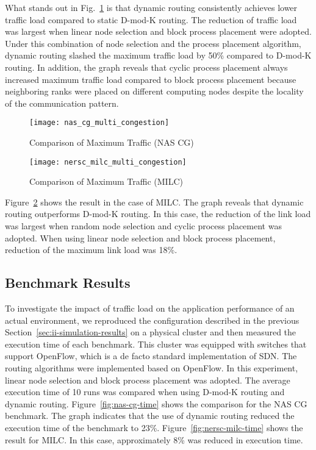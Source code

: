 What stands out in Fig.~\ref{fig:nas-cg-multi-congestion} is that
dynamic routing consistently achieves lower traffic load compared to
static \mbox{D-mod-K} routing. The reduction of traffic load was largest
when linear node selection and block process placement were adopted.
Under this combination of node selection and the process placement
algorithm, dynamic routing slashed the maximum traffic load by 50\%
compared to \mbox{D-mod-K} routing. In addition, the graph reveals that
cyclic process placement always increased maximum traffic load compared
to block process placement because neighboring ranks were placed on
different computing nodes despite the locality of the communication
pattern.

\begin{figure}
    \centering
    \texttt{[image: nas\_cg\_multi\_congestion]}
    \caption{Comparison of Maximum Traffic (NAS CG)}%
    \label{fig:nas-cg-multi-congestion}
\end{figure}

\begin{figure}
    \centering
    \texttt{[image: nersc\_milc\_multi\_congestion]}
    \caption{Comparison of Maximum Traffic (MILC)}%
    \label{fig:nersc-milc-multi-congestion}
\end{figure}

Figure~\ref{fig:nersc-milc-multi-congestion} shows the result in the
case of MILC\@. The graph reveals that dynamic routing outperforms
\mbox{D-mod-K} routing. In this case, the reduction of the link load was
largest when random node selection and cyclic process placement was
adopted. When using linear node selection and block process placement,
reduction of the maximum link load was 18\%.

\subsection{Benchmark Results}

To investigate the impact of traffic load on the application performance
of an actual environment, we reproduced the configuration described in
the previous Section~\ref{sec:ii-simulation-results} on a physical cluster and
then measured the execution time of each benchmark. This cluster was
equipped with switches that support OpenFlow, which is a de facto
standard implementation of SDN\@. The routing algorithms were implemented
based on OpenFlow. In this experiment, linear node selection and block
process placement was adopted. The average execution time of 10 runs was
compared when using \mbox{D-mod-K} routing and dynamic routing.
Figure~\ref{fig:nas-cg-time} shows the comparison for the NAS CG
benchmark. The graph indicates that the use of dynamic routing reduced
the execution time of the benchmark to 23\%.
Figure~\ref{fig:nersc-milc-time} shows the result for MILC\@. In this
case, approximately 8\% was reduced in execution time.

